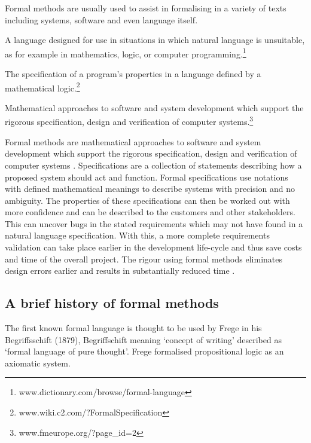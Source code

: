 Formal methods are usually used to assist in formalising in a variety of texts including systems, software and even language itself.

\begin{defin}
A language designed for use in situations in which natural language is unsuitable, as for example in mathematics, logic, or computer programming.\footnote{www.dictionary.com/browse/formal-language}
\end{defin}

\begin{defin}
The specification of a program's properties in a language defined by a mathematical logic.\footnote{www.wiki.c2.com/?FormalSpecification}
\end{defin}

\begin{defin}
Mathematical approaches to software and system development which support the rigorous specification, design and verification of computer systems.\footnote{www.fmeurope.org/?page\_id=2}
\end{defin}

Formal methods are mathematical approaches to software and system development which support the rigorous specification, design and verification of computer systems \cite{fmeurope}. Specifications are a collection of statements describing how a proposed system should act and function. Formal specifications use notations with defined mathematical meanings to describe systems with precision and no ambiguity. The properties of these specifications can then be worked out with more confidence and can be described to the customers and other stakeholders. This can uncover bugs in the stated requirements which may not have found in a natural language specification. With this, a more complete requirements validation can take place earlier in the development life-cycle and thus save costs and time of the overall project. The rigour using formal methods eliminates design errors earlier and results in substantially reduced time \cite{benefitsofform}. 

\subsection{A brief history of formal methods}

The first known formal language is thought to be used by Frege in his Begriffsschift (1879), Begriffschift meaning `concept of writing' described as `formal language of pure thought'. Frege formalised propositional logic as an axiomatic system.

